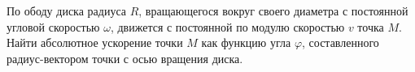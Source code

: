 По ободу диска радиуса $R$, вращающегося вокруг своего диаметра с
постоянной угловой скоростью $\omega$, движется с постоянной по модулю
скоростью $v$ точка $M$. Найти абсолютное ускорение точки $M$ как
функцию угла $\varphi$, составленного радиус-вектором точки с осью
вращения диска.
